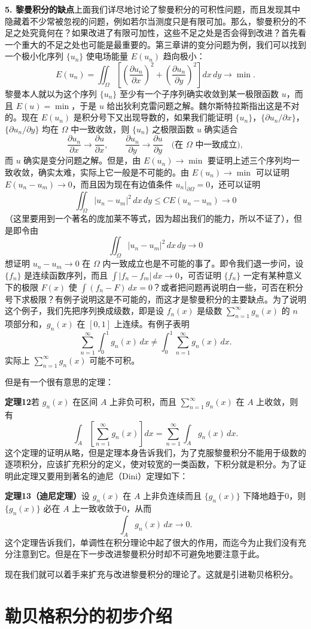 \medskip
\noindent\textbf{5. 黎曼积分的缺点}\quad 上面我们详尽地讨论了黎曼积分的可积性问题，而且发现其中隐藏着不少常被忽视的问题，例如若尔当测度只是有限可加。那么，黎曼积分的不足之处究竟何在？如果改进了有限可加性，这些不足之处是否会得到改进？首先看一个重大的不足之处也可能是最重要的。第三章讲的变分问题为例，我们可以找到一个极小化序列 $\{u_n\}$ 使电场能量 $E(u_n)$ 趋向极小：
\[
 E(u_n)=\iint_{\Omega}\left[\left(\frac{\partial u_n}{\partial x}\right)^2
 +\left(\frac{\partial u_n}{\partial y}\right)^2\right]dx\,dy\to\min.
\]
黎曼本人就以为这个序列 $\{u_n\}$ 至少有一个子序列确实收敛到某一极限函数 $u$，而且 $E(u)=\min$，于是 $u$ 给出狄利克雷问题之解。魏尔斯特拉斯指出这是不对的。现在 $E(u_n)$ 是积分号下又出现导数的，如果我们能证明 $\{u_n\}$，$\{\partial u_n/\partial x\}$，$\{\partial u_n/\partial y\}$ 均在 $\Omega$ 中一致收敛，则 $\{u_n\}$ 之极限函数 $u$ 确实适合
\[
 \frac{\partial u_n}{\partial x}\to\frac{\partial u}{\partial x},\qquad
 \frac{\partial u_n}{\partial y}\to\frac{\partial u}{\partial y}
 \quad\text{(在 }\Omega\text{ 中一致成立)},
\]
而 $u$ 确实是变分问题之解。但是，由 $E(u_n)\to\min$ 要证明上述三个序列均一致收敛，确实太难，实际上它一般是不可能的。由 $E(u_n)\to\min$ 可以证明 $E(u_n-u_m)\to0$，而且因为现在有边值条件 $u_n|_{\partial\Omega}=0$，还可以证明
\[
 \iint_{\Omega}|u_n-u_m|^2\,dx\,dy\le CE(u_n-u_m)\to0
\]
（这里要用到一个著名的庞加莱不等式，因为超出我们的能力，所以不证了），但是即令由
\[
 \iint_{\Omega}|u_n-u_m|^2\,dx\,dy\to0
\]
想证明 $u_n-u_m\to0$ 在 $\Omega$ 内一致成立也是不可能的事了。即令我们退一步问，设 $\{f_n\}$ 是连续函数序列，而且 $\int|f_n-f_m|\,dx\to0$，可否证明 $\{f_n\}$ 一定有某种意义下的极限 $F(x)$ 使 $\int(f_n-F)\,dx=0$？或者把问题再说明白一些，可否在积分号下求极限？有例子说明这是不可能的，而这才是黎曼积分的主要缺点。为了说明这个例子，我们先把序列换成级数，即是设 $f_n(x)$ 是级数 $\sum_{n=1}^{\infty}g_n(x)$ 的 $n$ 项部分和，$g_n(x)$ 在 $[0,1]$ 上连续。有例子表明
\[
 \sum_{n=1}^{\infty}\int_0^1g_n(x)\,dx\ne
 \int_0^1\sum_{n=1}^{\infty}g_n(x)\,dx.
\]
实际上 $\sum_{n=1}^{\infty}g_n(x)$ 可能不可积。

但是有一个很有意思的定理：

\noindent\textbf{定理12}\quad 若 $g_n(x)$ 在区间 $A$ 上非负可积，而且 $\sum_{n=1}^{\infty}g_n(x)$ 在 $A$ 上收敛，则有
\[
 \int_A\left[\sum_{n=1}^{\infty}g_n(x)\right]dx
 =\sum_{n=1}^{\infty}\int_A g_n(x)\,dx.
\]
这个定理的证明从略，但是定理本身告诉我们，为了克服黎曼积分不能用于级数的逐项积分，应该扩充积分的定义，使对较宽的一类函数，下积分就是积分。为了证明此定理又要用到著名的迪尼（Dini）定理如下：

\noindent\textbf{定理13（迪尼定理）}\quad 设 $g_n(x)$ 在 $A$ 上非负连续而且 $\{g_n(x)\}$ 下降地趋于0，则 $\{g_n(x)\}$ 必在 $A$ 上一致收敛于0，从而
\[
 \int_A g_n(x)\,dx\to0.
\]
这个定理告诉我们，单调性在积分理论中起了很大的作用，而迄今为止我们没有充分注意到它。但是在下一步改进黎曼积分时却不可避免地要注意于此。

现在我们就可以着手来扩充与改进黎曼积分的理论了。这就是引进勒贝格积分。

\section{勒贝格积分的初步介绍}
